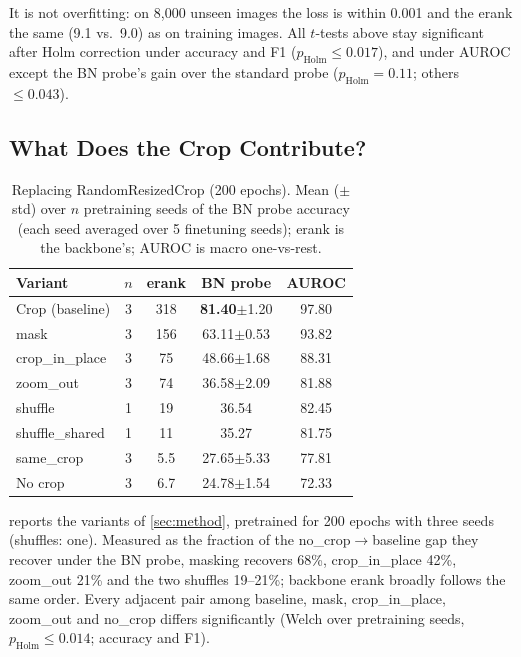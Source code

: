 \documentclass[10pt,twocolumn,letterpaper]{article}
\newcommand{\pmstd}[1]{{\scriptsize$\pm$#1}}
\begin{document}
It is not overfitting: on 8,000 unseen images the loss is within 0.001 and the erank the same (9.1 vs.\ 9.0) as on training images.
All $t$-tests above stay significant after Holm correction under accuracy and F1 ($p_\text{Holm}\le0.017$), and under AUROC except the BN probe's gain over the standard probe ($p_\text{Holm}{=}0.11$; others $\le0.043$).

\subsection{What Does the Crop Contribute?}
\label{sec:exp_crop}

\begin{table}[t]
\centering
\small
\setlength\tabcolsep{3pt}
\begin{tabular}{lcccc}
\toprule
Variant & $n$ & erank & BN probe & AUROC \\
\midrule
Crop (baseline) & 3 & 318 & \textbf{81.40}\pmstd{1.20} & 97.80 \\
mask & 3 & 156 & 63.11\pmstd{0.53} & 93.82 \\
crop\_in\_place & 3 & 75 & 48.66\pmstd{1.68} & 88.31 \\
zoom\_out & 3 & 74 & 36.58\pmstd{2.09} & 81.88 \\
shuffle & 1 & 19 & 36.54 & 82.45 \\
shuffle\_shared & 1 & 11 & 35.27 & 81.75 \\
same\_crop & 3 & 5.5 & 27.65\pmstd{5.33} & 77.81 \\
No crop & 3 & 6.7 & 24.78\pmstd{1.54} & 72.33 \\
\bottomrule
\end{tabular}
\caption{Replacing RandomResizedCrop (200 epochs). Mean (\pmstd{std}) over $n$ pretraining seeds of the BN probe accuracy (each seed averaged over 5 finetuning seeds); erank is the backbone's; AUROC is macro one-vs-rest.}
\label{tab:crop}
\end{table}

 reports the variants of \cref{sec:method}, pretrained for 200 epochs with three seeds (shuffles: one).
Measured as the fraction of the no\_crop$\to$baseline gap they recover under the BN probe, masking recovers 68\%, crop\_in\_place 42\%, zoom\_out 21\% and the two shuffles 19--21\%; backbone erank broadly follows the same order.
Every adjacent pair among baseline, mask, crop\_in\_place, zoom\_out and no\_crop differs significantly (Welch over pretraining seeds, $p_\text{Holm}\le0.014$; accuracy and F1).
\end{document}
